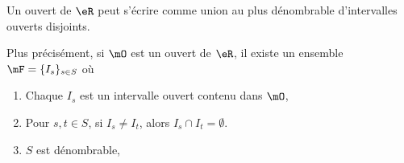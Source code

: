 \begin{proposition}     
    Un ouvert de \( \eR\) peut s'écrire comme union au plus dénombrable d'intervalles ouverts disjoints.

    Plus précisément, si \( \mO\) est un ouvert de \( \eR\), il existe un ensemble \( \mF=\{ I_s \}_{s\in S}\) où
    \begin{enumerate}
        \item
            Chaque \( I_s\) est un intervalle ouvert contenu dans \( \mO\),
        \item
            Pour \( s,t\in S\), si \( I_s\neq I_t\), alors \( I_s\cap I_t=\emptyset\).
        \item
            \( S\) est dénombrable,
    \end{enumerate}
\end{proposition}


